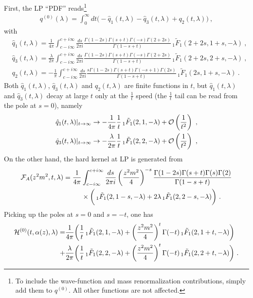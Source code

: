 \documentclass[a4paper,11pt]{article}
\begin{document}
First, the LP ``PDF'' reads\footnote{To include the wave-function and mass renormalization  contributions, simply add them to $q^{(0)}$. All other functions are not affected. }
\begin{align}\label{eq:q0}
q^{(0)}(\lambda)=\int_{0}^{\infty} dt \bigg(-\hat q_1(t,\lambda)-\hat q_3(t,\lambda)+q_2(t,\lambda)\bigg)\ ,
\end{align}
with
\begin{align}
&\hat q_1(t,\lambda)=\frac{1}{4\pi}\int_{c-i\infty}^{c+i\infty}\frac{ds}{2\pi i} \frac{\Gamma(1-2s)\Gamma(s+t)\Gamma(-s)\Gamma(2+2s)}{\Gamma(1-s+t)}\,_1\tilde F_1(2+2s,1+s,-\lambda) \ , \label{eq: q1}\\ 
&\hat q_3(t,\lambda)=\frac{\lambda}{2\pi}\int_{c-i\infty}^{c+i\infty}\frac{ds}{2\pi i} \frac{\Gamma(1-2s)\Gamma(s+t)\Gamma(-s)\Gamma(2+2s)}{\Gamma(1-s+t)}\,_1\tilde F_1(2+2s,2+s,-\lambda)\ , \label{eq:q3} \\ 
&q_2(t,\lambda)=-\frac{1}{\pi}\int_{c-i\infty}^{c+i\infty}\frac{ds}{2\pi i} \frac{s\Gamma(1-2s)\Gamma(s+t)\Gamma(-s+1)\Gamma(2s)}{\Gamma(1-s+t)}\,_1\tilde F_1(2s,1+s,-\lambda) \label{eq:q2}\ .
\end{align}
Both $\hat q_1(t,\lambda)$, $\hat q_3(t,\lambda)$ and $q_2(t,\lambda)$ are finite functions in $t$, but $\hat q_1(t,\lambda)$ and $\hat q_3(t,\lambda)$ decay at large $t$ only at the $\frac{1}{t}$ speed (the $\frac{1}{t}$ tail can be read from the pole at $s=0$), namely
\begin{align}
\hat q_1(t,\lambda)|_{t\rightarrow \infty}\rightarrow-\frac{1}{4\pi} \frac{1}{t}\,_1\tilde F_1(2,1,-\lambda)+{\cal O}\left(\frac{1}{t^2}\right) \ , \\ 
\hat q_3(t,\lambda)|_{t\rightarrow \infty}\rightarrow-\frac{\lambda}{2\pi} \frac{1}{t}\,_1\tilde F_1(2,2,-\lambda)+{\cal O}\left(\frac{1}{t^2}\right) \ ,
\end{align}
On the other hand, the hard kernel at LP is generated from 
\begin{align}
{\cal F}_A(z^2m^2,t,\lambda)=\frac{1}{4\pi}&\int_{c-i\infty}^{c+i\infty}\frac{ds}{2\pi i}  \left(\frac{z^2m^2}{4}\right)^{-s} \frac{\Gamma(1-2s)\Gamma(s+t)\Gamma(s)\Gamma(2)}{\Gamma(1-s+t)}\nonumber \\ 
&\times \bigg(\,_1\tilde F_1(2,1-s,-\lambda)+2\lambda\,_1\tilde F_1(2,2-s,-\lambda)\bigg)\ .
\end{align}
Picking up the poles at $s=0$ and $s=-t$, one has
\begin{align}\label{eq:h0}
{\cal H}^{(0)}(t,\alpha(z),\lambda)=&\frac{1}{4\pi}\bigg(\frac{1}{t}\,_1\tilde F_1(2,1,-\lambda)+\left(\frac{z^2m^2}{4}\right)^{t}\Gamma(-t)\,_1\tilde F_1(2,1+t,-\lambda)\bigg) \nonumber \\ 
+&\frac{\lambda}{2\pi}\bigg(\frac{1}{t}\,_1\tilde F_1(2,2,-\lambda)+\left(\frac{z^2m^2}{4}\right)^{t}\Gamma(-t)\,_1\tilde F_1(2,2+t,-\lambda)\bigg) \ .
\end{align}
\end{document}
